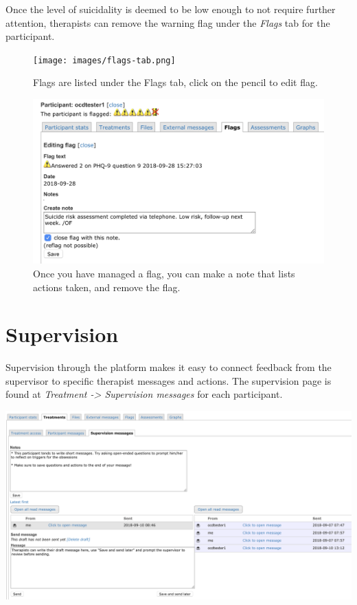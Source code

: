 \documentclass[]{book}
\theoremstyle{definition}
\theoremstyle{definition}
\theoremstyle{definition}
\theoremstyle{remark}
\begin{document}
Once the level of suicidality is deemed to be low enough to not require
further attention, therapists can remove the warning flag under the
\emph{Flags} tab for the participant.

\begin{figure}
\centering
\texttt{[image: images/flags-tab.png]}
\caption{Flags are listed under the Flags tab, click on the pencil to
edit flag.}
\end{figure}

\begin{figure}
\centering
\includegraphics{images/remove-flag.png}
\caption{Once you have managed a flag, you can make a note that lists
actions taken, and remove the flag.}
\end{figure}

\hypertarget{supervision}{%
\section{Supervision}\label{supervision}}

Supervision through the platform makes it easy to connect feedback from
the supervisor to specific therapist messages and actions. The
supervision page is found at \emph{Treatment -\textgreater{} Supervision
messages} for each participant.

\includegraphics{images/supervision.png}
\end{document}
